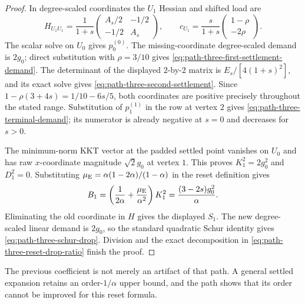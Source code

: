 \begin{proof}
In degree-scaled coordinates the $U_1$ Hessian and shifted load are
\begin{equation*}
 H_{U_1U_1}=\frac1{1+s}
 \begin{pmatrix}A_s/2&-1/2\\-1/2&A_s\end{pmatrix},
 \qquad
 c_{U_1}=\frac{s}{1+s}
 \begin{pmatrix}1-\rho\\-2\rho\end{pmatrix}.
\end{equation*}
The scalar solve on $U_0$ gives $p_0^{(0)}$.  The missing-coordinate
degree-scaled demand is $2g_0$; direct substitution with $\rho=3/10$ gives
\cref{eq:path-three-first-settlement-demand}.  The determinant of the
displayed $2$-by-$2$ matrix is $E_s/[4(1+s)^2]$, and its exact solve gives
\cref{eq:path-three-second-settlement}.  Since
$1-\rho(3+4s)=1/10-6s/5$, both coordinates are positive precisely throughout
the stated range.  Substitution of $p_1^{(1)}$ in the row at vertex $2$
gives \cref{eq:path-three-terminal-demand}; its numerator is already negative
at $s=0$ and decreases for $s>0$.

The minimum-norm KKT vector at the padded settled point vanishes on $U_0$
and has raw $x$-coordinate magnitude $\sqrt2g_0$ at vertex $1$.  This proves
$K_1^2=2g_0^2$ and $D_1^2=0$.  Substituting
$\mu_{\rm E}=\alpha(1-2\alpha)/(1-\alpha)$ in the reset definition gives
\begin{equation*}
 B_1=\left(\frac1{2\alpha}+\frac{\mu_{\rm E}}{\alpha^2}\right)K_1^2
 =\frac{(3-2s)g_0^2}{\alpha}.
\end{equation*}
Eliminating the old coordinate in $H$ gives the displayed $S_1$.  The new
degree-scaled linear demand is $2g_0$, so the standard quadratic Schur identity
gives \cref{eq:path-three-schur-drop}.  Division and the exact decomposition
in \cref{eq:path-three-reset-drop-ratio} finish the proof.
\end{proof}

The previous coefficient is not merely an artifact of that path.  A general
settled expansion retains an order-$1/\alpha$ upper bound, and the path shows
that its order cannot be improved for this reset formula.

